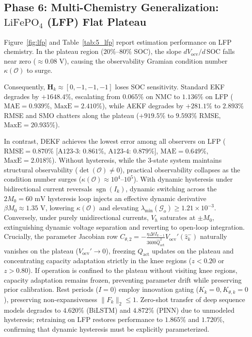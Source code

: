 \documentclass[preprint,12pt]{elsarticle}
\begin{document}
\subsection[Phase 6: Multi-Chemistry Generalization: LiFePO4 (LFP) Flat Plateau]{Phase 6: Multi-Chemistry Generalization: $\text{LiFePO}_4$ (LFP) Flat Plateau}
Figure~\ref{fig:lfp} and Table~\ref{tab:5_lfp} report estimation performance on LFP chemistry. In the plateau region ($20\%\text{--}80\%$ SOC), the slope $d V_{\text{ocv}} / d\,\text{SOC}$ falls near zero ($\approx 0.08\text{ V}$), causing the observability Gramian condition number $\kappa(\mathcal{O})$ to surge. 

Consequently, $\mathbf{H}_k \approx [0, -1, -1, -1]$ loses SOC sensitivity. Standard EKF degrades by $+1648.4\%$, escalating from $0.065\%$ on NMC to $1.136\%$ on LFP ($\text{MAE} = 0.939\%$, $\text{MaxE} = 2.410\%$), while AEKF degrades by $+281.1\%$ to $2.893\%$ RMSE and SMO chatters along the plateau ($+919.5\%$ to $9.593\%$ RMSE, $\text{MaxE} = 20.935\%$). 

In contrast, DEKF achieves the lowest error among all observers on LFP ($\text{RMSE} = 0.870\%$ [$\text{A123-3}$: $0.861\%$, $\text{A123-4}$: $0.879\%$], $\text{MAE} = 0.649\%$, $\text{MaxE} = 2.018\%$). Without hysteresis, while the 3-state system maintains structural observability ($\det(\mathcal{O}) \ne 0$), practical observability collapses as the condition number surges ($\kappa(\mathcal{O}) \approx 10^4\text{--}10^5$). With dynamic hysteresis under bidirectional current reversals $\operatorname{sgn}(I_k)$, dynamic switching across the $2M_0 = 60\text{ mV}$ hysteresis loop injects an effective dynamic derivative $\beta M_0 \approx 1.35\text{ V}$, lowering $\kappa(\mathcal{O})$ and elevating $\lambda_{\min}(\mathcal{G}_o) \ge 1.21 \times 10^{-3}$. Conversely, under purely unidirectional currents, $V_h$ saturates at $\pm M_0$, extinguishing dynamic voltage separation and reverting to open-loop integration. Crucially, the parameter Jacobian row $C_{\theta,2} = -\frac{\eta\Delta t I_{k-1}}{3600\hat{Q}_{\text{act}}^2} V_{\text{ocv}}'(\hat{z}_k^-)$ naturally vanishes on the plateau ($V_{\text{ocv}}' \to 0$), freezing $Q_{\text{act}}$ updates on the plateau and concentrating capacity adaptation strictly in the knee regions ($z < 0.20$ or $z > 0.80$). If operation is confined to the plateau without visiting knee regions, capacity adaptation remains frozen, preventing parameter drift while preserving prior calibration. Rest periods ($I=0$) employ innovation gating ($K_k=0, K_{\theta,k}=0$), preserving non-expansiveness $\|F_k\|_2 \le 1$. Zero-shot transfer of deep sequence models degrades to $4.620\%$ (BiLSTM) and $4.872\%$ (PINN) due to unmodeled hysteresis; retraining on LFP restores performance to $1.865\%$ and $1.720\%$, confirming that dynamic hysteresis must be explicitly parameterized.
\end{document}
